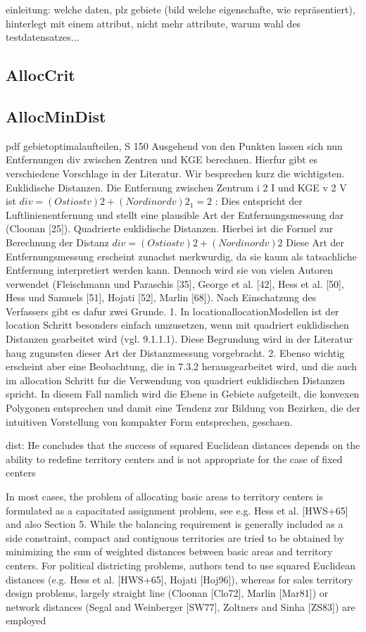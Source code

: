 einleitung: welche daten, plz gebiete (bild welche eigenschafte, wie repräsentiert), hinterlegt mit einem attribut, nicht mehr attribute, warum wahl des testdatensatzes...




\subsection{AllocCrit}

\subsection{AllocMinDist}

pdf gebietoptimalaufteilen, S 150
Ausgehend von den Punkten lassen sich nun Entfernungen div zwischen Zentren
und KGE berechnen. Hierfur gibt es verschiedene Vorschlage in der Literatur. Wir
besprechen kurz die wichtigsten.
Euklidische Distanzen. Die Entfernung zwischen Zentrum i 2 I und KGE v 2 V
ist
$div =(Osti  ostv)2 + (Nordi  nordv)2_1=2$
:
Dies entspricht der Luftlinienentfernung und stellt eine plausible Art der Entfernungsmessung
dar (Cloonan [25]).
Quadrierte euklidische Distanzen. Hierbei ist die Formel zur Berechnung der
Distanz
$div = (Osti  ostv)2 + (Nordi  nordv)2$
Diese Art der Entfernungsmessung erscheint zunachst merkwurdig, da sie kaum als
tatsachliche Entfernung interpretiert werden kann. Dennoch wird sie von vielen Autoren
verwendet (Fleischmann und Paraschis [35], George et al. [42], Hess et al. [50],
Hess und Samuels [51], Hojati [52], Marlin [68]). Nach Einschatzung des Verfassers
gibt es dafur zwei Grunde.
1. In locationallocationModellen ist der location Schritt besonders einfach umzusetzen,
	wenn mit quadriert euklidischen Distanzen gearbeitet wird (vgl. 9.1.1.1).
	Diese Begrundung wird in der Literatur haug zugunsten dieser Art der Distanzmessung
	vorgebracht.
	2. Ebenso wichtig erscheint aber eine Beobachtung, die in 7.3.2 herausgearbeitet
	wird, und die auch im allocation Schritt fur die Verwendung von quadriert
	euklidischen Distanzen spricht. In diesem Fall namlich wird die Ebene in Gebiete
	aufgeteilt, die konvexen Polygonen entsprechen und damit eine Tendenz
	zur Bildung von Bezirken, die der intuitiven Vorstellung von kompakter Form
	entsprechen, geschaen.

dist: He concludes that the success of squared
Euclidean distances depends on the ability to redefine territory centers and is not appropriate
for the case of fixed centers

In most cases, the problem of allocating basic areas to territory centers is formulated as a
capacitated assignment problem, see e.g. Hess et al. [HWS+65] and also Section 5. While
the balancing requirement is generally included as a side constraint, compact and contiguous
territories are tried to be obtained by minimizing the sum of weighted distances between basic
areas and territory centers. For political districting problems, authors tend to use squared
Euclidean distances (e.g. Hess et al. [HWS+65], Hojati [Hoj96]), whereas for sales territory
design problems, largely straight line (Cloonan [Clo72], Marlin [Mar81]) or network distances
(Segal and Weinberger [SW77], Zoltners and Sinha [ZS83]) are employed


